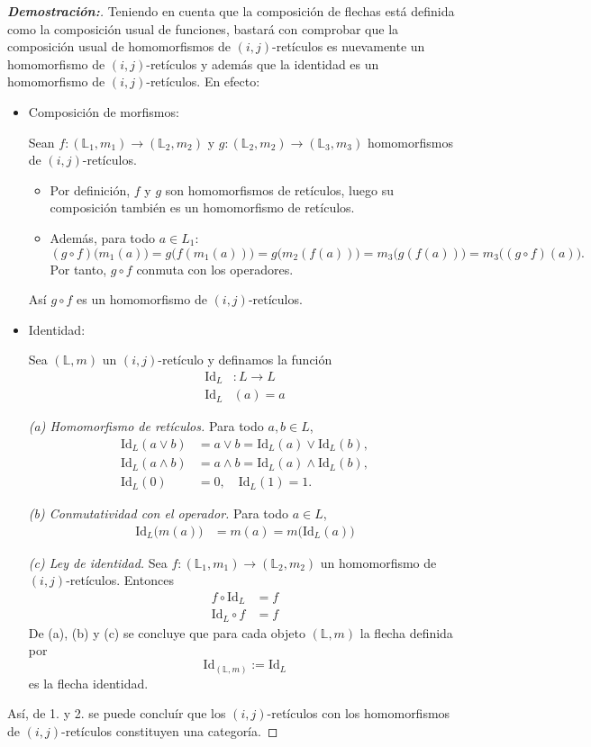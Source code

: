\documentclass[12pt]{book}
\newcommand{\Id}{\mathrm{Id}}
\begin{document}
\begin{proof}[{\textbf{Demostración:}}]
Teniendo en cuenta que la composición de flechas está definida como la composición usual de funciones, bastará con comprobar que la composición usual de homomorfismos de $(i,j)$-retículos es nuevamente un homomorfismo de $(i,j)$-retículos y además que la identidad es un homomorfismo de $(i,j)$-retículos. En efecto:
\begin{itemize}
\item[1.] Composición de morfismos:  

Sean $f\colon (\mathbb{L}_1, m_1)\rightarrow(\mathbb{L}_2, m_2)$ y $g\colon (\mathbb{L}_2, m_2)\rightarrow(\mathbb{L}_3, m_3)$ homomorfismos de \((i,j)\)-retículos.
\begin{itemize}
  \item Por definición, \(f\) y \(g\) son homomorfismos de retículos, luego su composición también es un homomorfismo de retículos.
  \item Además, para todo \(a \in L_1\):
  \[
    (g \circ f)\bigl(m_1(a)\bigr)
      = g\bigl(f(m_1(a))\bigr)
      = g\bigl(m_2(f(a))\bigr)
      = m_3\bigl(g(f(a))\bigr)
      = m_3\bigl((g \circ f)(a)\bigr).
  \]
  Por tanto, \(g\circ f\) conmuta con los operadores.
\end{itemize}
Así \(g\circ f\) es un homomorfismo de \((i,j)\)-retículos. 


\item[2.] Identidad:

Sea $(\mathbb{L},m)$ un $(i,j)$-retículo y definamos la función
\begin{align*}
\Id_{L}&\colon L\to L\\
\Id_{L}&(a) = a
\end{align*}

\medskip
\noindent\emph{(a) Homomorfismo de retículos.}  
Para todo $a,b\in L$,
\begin{align*}
\Id_{L}(a\vee b)&=a\vee b=\Id_{L}(a)\vee\Id_{L}(b),\\
\Id_{L}(a\wedge b)&=a\wedge b=\Id_{L}(a)\wedge\Id_{L}(b),\\
\Id_{L}(0)&=0,\quad\Id_{L}(1)=1.
\end{align*}

\medskip
\noindent\emph{(b) Conmutatividad con el operador.}  
Para todo $a\in L$,
\begin{align*}
\Id_{L}\bigl(m(a)\bigr)&=m(a)=m\bigl(\Id_{L}(a)\bigr)
\end{align*}

\medskip
\noindent\emph{(c) Ley de identidad.}  
Sea $f\colon(\mathbb{L}_1,m_1)\to(\mathbb{L}_2,m_2)$ un homomorfismo de $(i,j)$-retículos. Entonces
\begin{align*}
f\circ\Id_{L}&=f\\
\Id_{L}\circ f&=f
\end{align*}
\medskip
De (a), (b) y (c) se concluye que para cada objeto $(\mathbb{L},m)$ la flecha definida por 
\[
\Id_{(\mathbb{L},m)}:=\Id_{L}
\]
es la flecha identidad.

\end{itemize}
Así, de 1. y 2. se puede concluír que los $(i,j)$-retículos con los homomorfismos de $(i, j)$-retículos constituyen
una categoría.
\end{proof}
\end{document}
